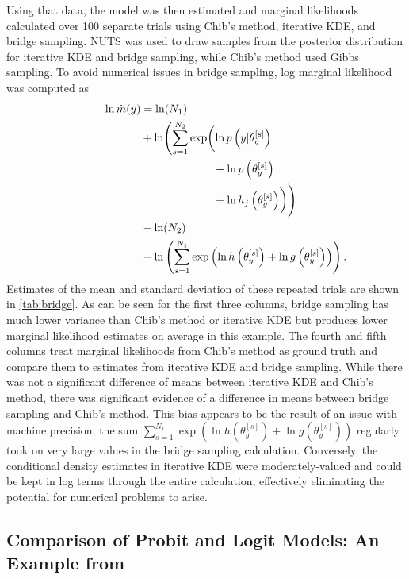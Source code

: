 \documentclass[twocolumn]{article}
\begin{document}
Using that data, the model was then estimated and marginal likelihoods calculated over 100 separate trials using Chib's method, iterative KDE, and bridge sampling. NUTS was used to draw samples from the posterior distribution for iterative KDE and bridge sampling, while Chib's method used Gibbs sampling. To avoid numerical issues in bridge sampling, log marginal likelihood was computed as
\begin{align*}
\label{eq:bridgeCalculation}
\ln\hat{m}(y) &= \ln(N_1)\\
&+ \ln\Biggl(\sum_{s=1}^{N_2} \exp\biggl(&&\hspace*{-13em}\ln p\left(y|\theta_{g}^{[s]}\right) \\& &&\hspace*{-13em}+ \ln p\left(\theta_{g}^{[s]}\right) \\& &&\hspace*{-13em} + \ln h_j\left(\theta_{g}^{[s]}\right)\biggr)\Biggr)\\
&- \ln(N_2)\\
&- \ln\left(\sum_{s=1}^{N_1} \exp\left(\ln h\left(\theta_{y}^{[s]}\right) + \ln g\left(\theta_{y}^{[s]}\right)\right)\right).
\end{align*}
Estimates of the mean and standard deviation of these repeated trials are shown in \cref{tab:bridge}. As can be seen for the first three columns, bridge sampling has much lower variance than Chib's method or iterative KDE but produces lower marginal likelihood estimates on average in this example. The fourth and fifth columns treat marginal likelihoods from Chib's method as ground truth and compare them to estimates from iterative KDE and bridge sampling. While there was not a significant difference of means between iterative KDE and Chib's method, there was significant evidence of a difference in means between bridge sampling and Chib's method. This bias appears to be the result of an issue with machine precision; the sum $\sum_{s=1}^{N_1} \exp\left(\ln h\left(\theta_{y}^{[s]}\right) + \ln g\left(\theta_{y}^{[s]}\right)\right)$ regularly took on very large values in the bridge sampling calculation. Conversely, the conditional density estimates in iterative KDE were moderately-valued and could be kept in log terms through the entire calculation, effectively eliminating the potential for numerical problems to arise.

\subsection{Comparison of Probit and Logit Models: An Example from \cite{Chib}}
\end{document}
